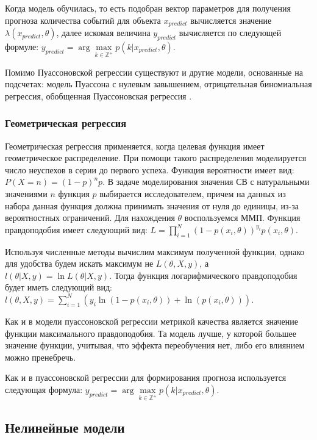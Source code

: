 Когда модель обучилась, то есть подобран вектор параметров для получения прогноза количества событий для объекта $x_{predict}$ вычисляется значение $\lambda(x_{predict}, \theta)$, далее искомая величина $y_{predict}$ вычисляется по следующей формуле: $y_{predict} = \arg\max\limits_{k \in \mathbb{Z}^+} p(k | x_{predict}, \theta)$.

Помимо Пуассоновской регрессии существуют и другие модели, основанные на подсчетах: модель Пуассона с нулевым завышением, отрицательная биномиальная регрессия, обобщенная Пуассоновская регрессия \cite{towardsdatascience:poisson_regression}.


\subsubsection{Геометрическая регрессия}

Геометрическая регрессия применяется, когда целевая функция имеет геометрическое распределение. При помощи такого распределения моделируется число неуспехов в серии до первого успеха. Функция вероятности имеет вид: $P(X=n)=(1-p)^{n}p$. В задаче моделирования значения СВ с натуральными значениями $n$ функция $p$ выбирается исследователем, причем на данных из набора данная функция должна принимать значения от нуля до единицы, из-за вероятностных ограничений. Для нахождения $\theta$ воспользуемся ММП. Функция правдоподобия имеет следующий вид: $L = \prod\limits_{i = 1}^N (1-p(x_i,\theta))^{y_i}p(x_i,\theta)$.

Используя численные методы вычислим максимум полученной функции, однако для удобства будем искать максимум не $L(\theta, X, y)$, а $l(\theta | X,y) = \ln L(\theta | X,y)$. Тогда функция логарифмического правдоподобия будет иметь следующий вид: $l(\theta, X, y) = \sum\limits_{i = 1}^N ( y_i \ln(1 - p(x_i,\theta)) + \ln(p(x_i,\theta)) )$.

Как и в модели пуассоновской регрессии метрикой качества является значение функции максимального правдоподобия. Та модель лучше, у которой большее значение функции, учитывая, что эффекта переобучения нет, либо его влиянием можно пренебречь.

Как и в пуассоновской регрессии для формирования прогноза используется следующая формула: $y_{predict} = \arg\max\limits_{k \in \mathbb{Z}^+} p(k | x_{predict}, \theta)$.



\subsection{Нелинейные модели}


